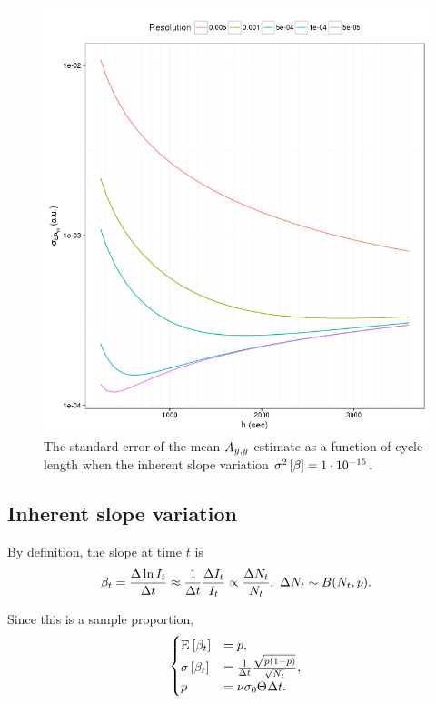 \documentclass{article}
\begin{document}
\begin{figure}[h]
\includegraphics[scale=1]{SEAyy_varB_15min}
\caption{The standard error of the mean $\Ayy$ estimate as a function of cycle length when the inherent slope variation $\v{\slp} = 1\cdot10^{-15}$.\label{fig:SEAyy_varb}}
\end{figure}

\subsection{Inherent slope variation}
By definition, the slope at time $t$ is
\[
 \slp[t] = \frac{\Delta \ln I_t}{\Delta t} \approx \frac{1}{\Delta t}\frac{\Delta I_t}{I_t} \propto \frac{\Delta N_t}{N_t}, ~\Delta N_t \sim B(N_t, p).
\]

Since this is a sample proportion, 
\begin{equation*}
\begin{cases}
	\Xpct{\slp[t]} 	&= p, \\
	\SE{\slp[t]}		&= \frac{1}{\Delta t}\frac{\sqrt{p(1-p)}}{\sqrt{N_t}}, \\
	p 				&= \nu\CS[0]\Thick\Delta t.
\end{cases}
\end{equation*}
\end{document}
